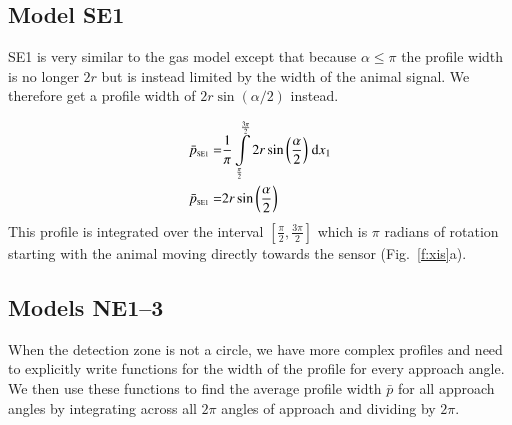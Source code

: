 \subsection{Model SE1} \label{SE1}
SE1 is very similar to the gas model except that because $\alpha \le \pi$ the profile width is no longer $2r$ but is instead limited by the width of the animal signal. We therefore get a profile width of $2r\sin(\alpha/2)$ instead. 

\begin{align}
    \bar{p}_{\text{\tiny{SE1}}} =&\frac{1}{\pi} \int\limits_{\frac{\pi}{2}}^{\frac{3 \pi}{2}}2 r \sin{\left (\frac{\alpha}{2} \right )}\;\mathrm{d}x_{1}\label{pSE1Def}\\
    \bar{p}_{\text{\tiny{SE1}}}  =& 2 r \sin{\left (\frac{\alpha}{2} \right )}\label{pSE1Sln}
\end{align}
This profile is integrated over the interval $[\frac{\pi}{2}, \frac{3\pi}{2}]$ which is $\pi$ radians of rotation starting with the animal moving directly towards the sensor (Fig.~\ref{f:xis}a).

\subsection{ Models NE1--3} \label{NE}

When the detection zone is not a circle, we have more complex profiles  and need to explicitly write functions for the width of the profile for every approach angle. We then use these functions to find the average profile width $\bar{p}$ for all approach angles by integrating across all $2\pi$ angles of approach and dividing by $2\pi$. 




